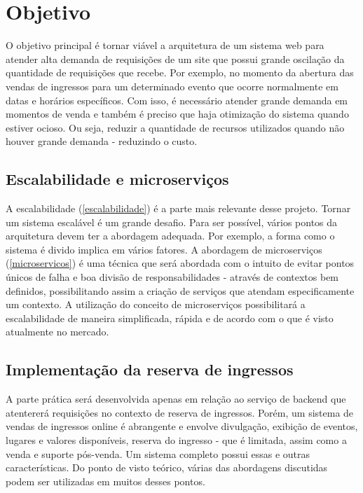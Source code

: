 \chapter{Objetivo}

O objetivo principal é tornar viável a arquitetura de um sistema web para atender
alta demanda de requisições de um site que possui grande oscilação da quantidade de
requisições que recebe.
Por exemplo, no momento da abertura das vendas de ingressos para um determinado evento
que ocorre normalmente em datas e horários específicos.
Com isso, é necessário atender grande demanda em momentos de venda e também
é preciso que haja otimização do sistema quando estiver ocioso.
Ou seja, reduzir a quantidade de recursos utilizados quando não houver
grande demanda - reduzindo o custo.

\section{Escalabilidade e microserviços}
A escalabilidade (\autoref{escalabilidade}) é a parte mais relevante desse projeto.
Tornar um sistema escalável é um grande desafio.
Para ser possível, vários pontos da arquitetura devem ter a
abordagem adequada. Por exemplo, a forma como o sistema é divido implica em vários
fatores.
A abordagem de microserviços (\autoref{microservicos}) é uma técnica que será abordada
com o intuito de evitar pontos únicos de falha e boa divisão de responsabilidades
- através de contextos bem definidos, possibilitando assim a criação de serviços que
atendam especificamente um contexto.
A utilização do conceito de microserviços possibilitará a escalabilidade de maneira
simplificada, rápida e de acordo com o que é visto atualmente no mercado.

\section{Implementação da reserva de ingressos}

A parte prática será desenvolvida apenas em relação ao serviço de backend que
atentererá requisições no contexto de reserva de ingressos.
Porém, um sistema de vendas de ingressos online é abrangente e envolve divulgação,
exibição de eventos, lugares e valores disponíveis, reserva do ingresso -
que é limitada, assim como a venda e suporte pós-venda. Um sistema completo possui essas
e outras características. Do ponto de visto teórico, várias das abordagens discutidas
podem ser utilizadas em muitos desses pontos.

